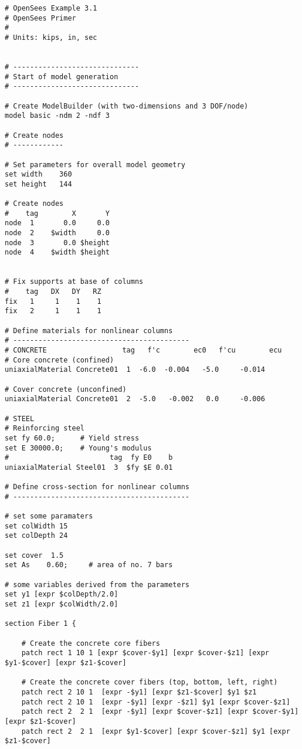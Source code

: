 \documentclass[12pt]{article}
\begin{document}
\vspace{0.2in} 
{\sf\small
\begin{verbatim}
# OpenSees Example 3.1
# OpenSees Primer
#
# Units: kips, in, sec


# ------------------------------
# Start of model generation
# ------------------------------

# Create ModelBuilder (with two-dimensions and 3 DOF/node)
model basic -ndm 2 -ndf 3

# Create nodes
# ------------

# Set parameters for overall model geometry
set width    360
set height   144

# Create nodes
#    tag        X       Y 
node  1       0.0     0.0 
node  2    $width     0.0 
node  3       0.0 $height
node  4    $width $height


# Fix supports at base of columns
#    tag   DX   DY   RZ
fix   1     1    1    1
fix   2     1    1    1

# Define materials for nonlinear columns
# ------------------------------------------
# CONCRETE                  tag   f'c        ec0   f'cu        ecu
# Core concrete (confined)
uniaxialMaterial Concrete01  1  -6.0  -0.004   -5.0     -0.014

# Cover concrete (unconfined)
uniaxialMaterial Concrete01  2  -5.0   -0.002   0.0     -0.006

# STEEL
# Reinforcing steel 
set fy 60.0;      # Yield stress
set E 30000.0;    # Young's modulus
#                        tag  fy E0    b
uniaxialMaterial Steel01  3  $fy $E 0.01

# Define cross-section for nonlinear columns
# ------------------------------------------

# set some paramaters
set colWidth 15
set colDepth 24 

set cover  1.5
set As    0.60;     # area of no. 7 bars

# some variables derived from the parameters
set y1 [expr $colDepth/2.0]
set z1 [expr $colWidth/2.0]

section Fiber 1 {

    # Create the concrete core fibers
    patch rect 1 10 1 [expr $cover-$y1] [expr $cover-$z1] [expr $y1-$cover] [expr $z1-$cover]

    # Create the concrete cover fibers (top, bottom, left, right)
    patch rect 2 10 1  [expr -$y1] [expr $z1-$cover] $y1 $z1
    patch rect 2 10 1  [expr -$y1] [expr -$z1] $y1 [expr $cover-$z1]
    patch rect 2  2 1  [expr -$y1] [expr $cover-$z1] [expr $cover-$y1] [expr $z1-$cover]
    patch rect 2  2 1  [expr $y1-$cover] [expr $cover-$z1] $y1 [expr $z1-$cover]


\end{verbatim}}
\end{document}
